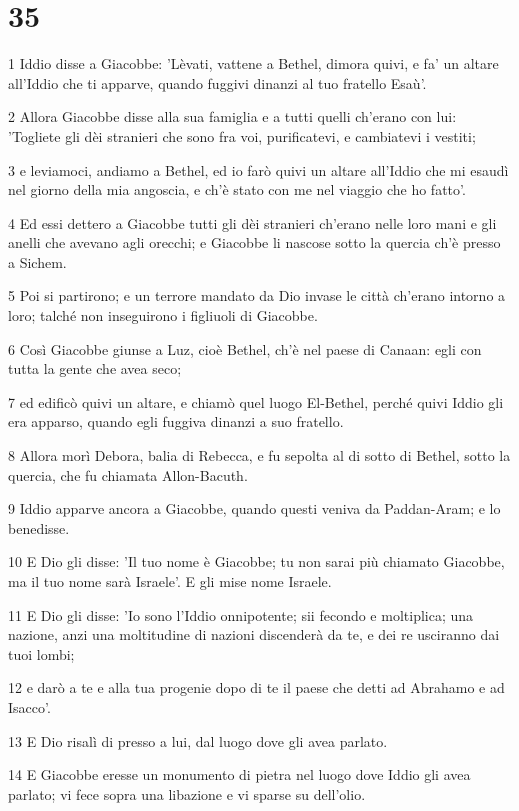 \chapter{35}

\par 1 Iddio disse a Giacobbe: 'Lèvati, vattene a Bethel, dimora quivi, e fa' un altare all'Iddio che ti apparve, quando fuggivi dinanzi al tuo fratello Esaù'.
\par 2 Allora Giacobbe disse alla sua famiglia e a tutti quelli ch'erano con lui: 'Togliete gli dèi stranieri che sono fra voi, purificatevi, e cambiatevi i vestiti;
\par 3 e leviamoci, andiamo a Bethel, ed io farò quivi un altare all'Iddio che mi esaudì nel giorno della mia angoscia, e ch'è stato con me nel viaggio che ho fatto'.
\par 4 Ed essi dettero a Giacobbe tutti gli dèi stranieri ch'erano nelle loro mani e gli anelli che avevano agli orecchi; e Giacobbe li nascose sotto la quercia ch'è presso a Sichem.
\par 5 Poi si partirono; e un terrore mandato da Dio invase le città ch'erano intorno a loro; talché non inseguirono i figliuoli di Giacobbe.
\par 6 Così Giacobbe giunse a Luz, cioè Bethel, ch'è nel paese di Canaan: egli con tutta la gente che avea seco;
\par 7 ed edificò quivi un altare, e chiamò quel luogo El-Bethel, perché quivi Iddio gli era apparso, quando egli fuggiva dinanzi a suo fratello.
\par 8 Allora morì Debora, balia di Rebecca, e fu sepolta al di sotto di Bethel, sotto la quercia, che fu chiamata Allon-Bacuth.
\par 9 Iddio apparve ancora a Giacobbe, quando questi veniva da Paddan-Aram; e lo benedisse.
\par 10 E Dio gli disse: 'Il tuo nome è Giacobbe; tu non sarai più chiamato Giacobbe, ma il tuo nome sarà Israele'. E gli mise nome Israele.
\par 11 E Dio gli disse: 'Io sono l'Iddio onnipotente; sii fecondo e moltiplica; una nazione, anzi una moltitudine di nazioni discenderà da te, e dei re usciranno dai tuoi lombi;
\par 12 e darò a te e alla tua progenie dopo di te il paese che detti ad Abrahamo e ad Isacco'.
\par 13 E Dio risalì di presso a lui, dal luogo dove gli avea parlato.
\par 14 E Giacobbe eresse un monumento di pietra nel luogo dove Iddio gli avea parlato; vi fece sopra una libazione e vi sparse su dell'olio.
